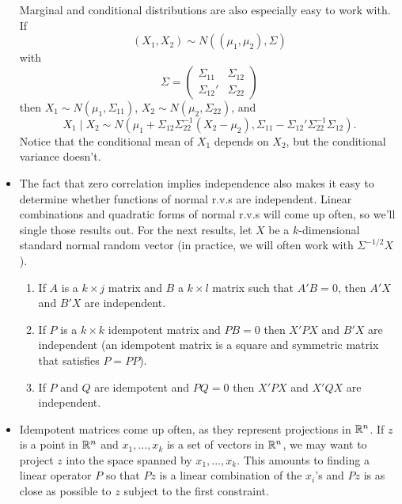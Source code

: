 \begin{itemize}
  Marginal and conditional distributions are also especially easy to
  work with.  If 
  \begin{equation*}
    (X_1,X_2) \sim N((\mu_1,\mu_2), \Sigma)
  \end{equation*}
  with
  \begin{equation*}
    \Sigma = \begin{pmatrix}
      \Sigma_{11} & \Sigma_{12} \\ \Sigma_{12}' & \Sigma_{22}
    \end{pmatrix}
  \end{equation*}
  then $X_1 \sim N(\mu_1, \Sigma_{11})$, $X_2 \sim N(\mu_2, \Sigma_{22})$, and
  \begin{equation*}    
    X_1 \mid X_2 \sim N(\mu_1 + \Sigma_{12} \Sigma_{22}^{-1} (X_2 - \mu_2),
               \Sigma_{11} - \Sigma_{12}'\Sigma_{22}^{-1} \Sigma_{12}).
  \end{equation*}
  Notice that the conditional mean of $X_1$ depends on $X_2$, but the
  conditional variance doesn't.

\item The fact that zero correlation implies independence also makes
  it easy to determine whether functions of normal r.v.s are
  independent.  Linear combinations and quadratic forms of normal
  r.v.s will come up often, so we'll single those results out.  For
  the next results, let $X$ be a $k$-dimensional standard normal
  random vector (in practice, we will often work with $\Sigma^{-1/2} X$).
  \begin{enumerate}
  \item If $A$ is a $k \times j$ matrix and $B$ a $k \times l$ matrix such that
    $A'B = 0$, then $A'X$ and $B'X$ are independent.
  \item If $P$ is a $k \times k$ idempotent matrix and $PB = 0$ then $X'PX$
    and $B'X$ are independent (an idempotent matrix is a square and
    symmetric matrix that satisfies $P = PP$).
  \item If $P$ and $Q$ are idempotent and $PQ = 0$ then $X'PX$ and
    $X'QX$ are independent.
  \end{enumerate}
  
\item Idempotent matrices come up often, as they represent projections
  in $\mathbb{R}^n$.  If $z$ is a point in $\mathbb{R}^n$ and $x_1,...,x_k$ is a set of
  vectors in $\mathbb{R}^n$, we may want to project $z$ into the space spanned
  by $x_1,...,x_k$.  This amounts to finding a linear operator $P$ so
  that $P z$ is a linear combination of the $x_i$'s and $P z$ is as
  close as possible to $z$ subject to the first constraint.


\end{itemize}
